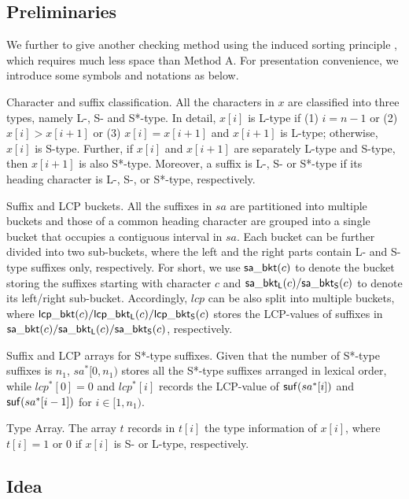 \documentclass[10pt,journal,compsoc]{IEEEtran}
\begin{document}
\subsection{Preliminaries} \label{sec:method2:preliminaries}

We further to give another checking method using the induced sorting principle \cite{Nong11,Dementiev08}, which requires much less space than Method A. For presentation convenience, we introduce some symbols and notations as below.

Character and suffix classification. All the characters in $x$ are classified into three types, namely L-, S- and S*-type. In detail, $x[i]$ is L-type if (1) $i = n - 1$ or (2) $x[i] > x[i + 1]$ or (3) $x[i] = x[i + 1]$ and $x[i + 1]$ is L-type; otherwise, $x[i]$ is S-type. Further, if $x[i]$ and $x[i + 1]$ are separately L-type and S-type, then $x[i + 1]$ is also S*-type. Moreover, a suffix is L-, S- or S*-type if its heading character is L-, S-, or S*-type, respectively.

Suffix and LCP buckets. All the suffixes in $sa$ are partitioned into multiple buckets and those of a common heading character are grouped into a single bucket that occupies a contiguous interval in $sa$. Each bucket can be further divided into two sub-buckets, where the left and the right parts  contain L- and S-type suffixes only, respectively. For short, we use ${\sf sa\_bkt}(c)$ to denote the bucket storing the suffixes starting with character $c$ and ${\sf sa\_bkt_L}(c)/{\sf sa\_bkt_S}(c)$ to denote its left/right sub-bucket. Accordingly, $lcp$ can be also split into multiple buckets, where ${\sf lcp\_bkt}(c)/{\sf lcp\_bkt_L}(c)/{\sf lcp\_bkt_S}(c)$ stores the LCP-values of suffixes in ${\sf sa\_bkt}(c)/{\sf sa\_bkt_L}(c)/{\sf sa\_bkt_S}(c)$, respectively.

Suffix and LCP arrays for S*-type suffixes. Given that the number of S*-type suffixes is $n_1$, $sa^*[0, n_1)$ stores all the S*-type suffixes arranged in lexical order, while $lcp^*[0] = 0$ and $lcp^*[i]$ records the LCP-value of ${\sf suf}(sa^*[i])$ and ${\sf suf}(sa^*[i - 1])$ for $i \in [1, n_1)$.

Type Array. The array $t$ records in $t[i]$ the type information of $x[i]$, where $t[i] = 1$ or $0$ if $x[i]$ is S- or L-type, respectively.

\subsection{Idea} \label{sec:method2:idea}
\end{document}
